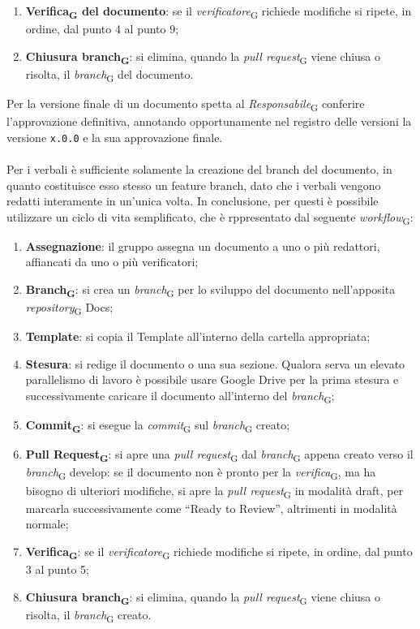 \begin{enumerate}
    \item \textbf{Verifica\textsubscript{G} del documento}: se il \textit{verificatore}\textsubscript{G} richiede modifiche si ripete, in ordine, dal punto 4 al punto 9;
    \item \textbf{Chiusura branch\textsubscript{G}}: si elimina, quando la \textit{pull request}\textsubscript{G} viene chiusa o risolta, il \textit{branch}\textsubscript{G} del documento.
\end{enumerate}
Per la versione finale di un documento spetta al \textit{Responsabile}\textsubscript{G} conferire l’approvazione definitiva, annotando opportunamente nel registro delle versioni la versione \texttt{x.0.0} e la sua approvazione finale.\\ \\
Per i verbali è sufficiente solamente la creazione del branch del documento, in quanto costituisce esso stesso un feature branch, dato che i verbali vengono redatti interamente in un'unica volta. In conclusione, per questi è possibile utilizzare un ciclo di vita semplificato, che è rppresentato dal seguente \textit{workflow}\textsubscript{G}:
\begin{enumerate}
    \item \textbf{Assegnazione}: il gruppo assegna un documento a uno o più redattori, affiancati da uno o più verificatori;
    \item \textbf{Branch\textsubscript{G}}: si crea un \textit{branch}\textsubscript{G} per lo sviluppo del documento nell’apposita \textit{repository}\textsubscript{G} Docs;
    \item \textbf{Template}: si copia il Template all'interno della cartella appropriata;
    \item \textbf{Stesura}: si redige il documento o una sua sezione. Qualora serva un elevato parallelismo di lavoro è possibile usare Google Drive per la prima stesura e successivamente caricare il documento all’interno del \textit{branch}\textsubscript{G};
    \item \textbf{Commit\textsubscript{G}}: si esegue la \textit{commit}\textsubscript{G} sul \textit{branch}\textsubscript{G} creato;
    \item \textbf{Pull Request\textsubscript{G}}: si apre una \textit{pull request}\textsubscript{G} dal \textit{branch}\textsubscript{G} appena creato verso il \textit{branch}\textsubscript{G} develop: se il documento non è pronto per la \textit{verifica}\textsubscript{G}, ma ha bisogno di ulteriori modifiche, si apre la \textit{pull request}\textsubscript{G} in modalità draft, per marcarla successivamente come “Ready to Review”, altrimenti in modalità normale;
    \item \textbf{Verifica\textsubscript{G}}: se il \textit{verificatore}\textsubscript{G} richiede modifiche si ripete, in ordine, dal punto 3 al punto 5;
    \item \textbf{Chiusura branch\textsubscript{G}}: si elimina, quando la \textit{pull request}\textsubscript{G} viene chiusa o risolta, il \textit{branch}\textsubscript{G} creato.
\end{enumerate}


